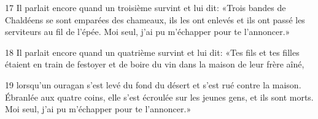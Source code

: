 
17 Il parlait encore quand un troisième survint et lui dit: «Trois bandes de Chaldéens se sont emparées des chameaux, ils les ont enlevés et ils ont passé les serviteurs au fil de l’épée. Moi seul, j’ai pu m’échapper pour te l’annoncer.»

18 Il parlait encore quand un quatrième survint et lui dit: «Tes fils et tes filles étaient en train de festoyer et de boire du vin dans la maison de leur frère aîné,

19 lorsqu’un ouragan s’est levé du fond du désert et s’est rué contre la maison. Ébranlée aux quatre coins, elle s’est écroulée sur les jeunes gens, et ils sont morts. Moi seul, j’ai pu m’échapper pour te l’annoncer.»
